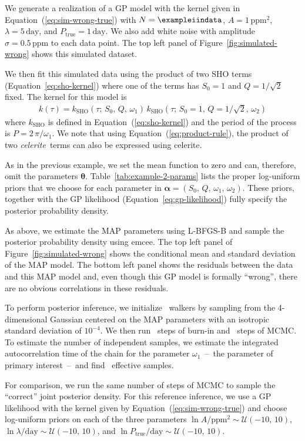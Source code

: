 \documentclass[manuscript, letterpaper]{aastex6}
\newcommand{\project}[1]{\textsf{#1}}
\newcommand{\celerite}{\project{celerite}}
\newcommand{\celeriteterm}{\emph{celerite}}
\newcommand{\emcee}{\project{emcee}}
\newcommand{\figureref}[1]{\ref{fig:#1}}
\newcommand{\Figure}[1]{Figure~\figureref{#1}}
\renewcommand{\eqref}[1]{\ref{eq:#1}}
\newcommand{\Eq}[1]{Equation~(\eqref{#1})}
\newcommand{\eq}[1]{\Eq{#1}}
\newcommand{\eqalt}[1]{Equation~\eqref{#1}}
\newcommand{\bvec}[1]{{\ensuremath{\boldsymbol{#1}}}}
\newcommand{\response}[1]{{\color{blue}#1}}
\begin{document}
\response{We generate a realization of a GP model with the kernel given in
\eq{sim-wrong-true} with $N = \exampleiindata$, $A = 1\,\mathrm{ppm}^2$,
$\lambda = 5\,\mathrm{day}$, and $P_\mathrm{true} = 1\,\mathrm{day}$.
We also add white noise with amplitude $\sigma = 0.5\,\mathrm{ppm}$ to each
data point.
The top left panel of \Figure{simulated-wrong} shows this simulated dataset.

We then fit this simulated data using the product of two SHO terms
(\eqalt{sho-kernel}) where one of the terms has $S_0 = 1$ and $Q =
1/\sqrt{2}$ fixed.
The kernel for this model is
\begin{eqnarray}
k(\tau) = k_\mathrm{SHO}(\tau;\,S_0,\,Q,\,\omega_1) \,
    k_\mathrm{SHO}(\tau;\,S_0 = 1,\,Q = 1/\sqrt{2},\,\omega_2)
\end{eqnarray}
where $k_\mathrm{SHO}$ is defined in \eq{sho-kernel} and the period of the
process is $P=2\,\pi/\omega_1$.
We note that using \eq{product-rule}, the product of two \celeriteterm\ terms
can also be expressed using \celerite.

As in the previous example, we set the mean function to zero and can,
therefore, omit the parameters $\bvec{\theta}$.
Table~\ref{tab:example-2-params} lists the proper log-uniform priors that we
choose for each parameter in $\bvec{\alpha} =
(S_0,\,Q,\,\omega_1,\,\omega_2)$.
These priors, together with the GP likelihood (\eqalt{gp-likelihood}) fully
specify the posterior probability density.

As above, we estimate the MAP parameters using \project{L-BFGS-B} and sample
the posterior probability density using \emcee.
The top left panel of \Figure{simulated-wrong} shows the conditional mean and
standard deviation of the MAP model.
The bottom left panel shows the residuals between the data and this MAP model
and, even though this GP model is formally ``wrong'', there are no obvious
correlations in these residuals.

To perform posterior inference, we initialize \exampleiinwalkers~walkers by
sampling from the 4-dimensional Gaussian centered on the MAP parameters with
an isotropic standard deviation of $10^{-4}$.
We then run \exampleiinburn~steps of burn-in and \exampleiinsteps~steps of
MCMC.
To estimate the number of independent samples, we estimate the integrated
autocorrelation time of the chain for the parameter $\omega_1$~--~the
parameter of primary interest~--~and find \exampleiineff~effective samples.

For comparison, we run the same number of steps of MCMC to sample the
``correct'' joint posterior density.
For this reference inference, we use a GP likelihood with the kernel given by
\eq{sim-wrong-true} and choose log-uniform priors on each of the
three parameters $\ln A/\mathrm{ppm}^2 \sim \mathcal{U}(-10,\,10)$,
$\ln \lambda/\mathrm{day} \sim \mathcal{U}(-10,\,10)$, and
$\ln P_\mathrm{true}/\mathrm{day} \sim \mathcal{U}(-10,\,10)$.

}
\end{document}
